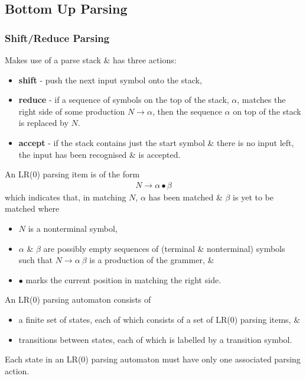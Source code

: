 \subsection{Bottom Up Parsing}

\subsubsection{Shift/Reduce Parsing}
Makes use of a parse stack \& has three actions:
\begin{itemize}
    \item \textbf{shift} - push the next input symbol onto the stack,
    \item \textbf{reduce} - if a sequence of symbols on the top of the stack, $\alpha$, 
    matches the right side of some production $N \rightarrow \alpha$, then the sequence 
    $\alpha$ on top of the stack is replaced by $N$.
    \item \textbf{accept} - if the stack contains just the start symbol \& there is no
    input left, the input has been recognised \& is accepted.
\end{itemize}

An LR(0) parsing item is of the form
\begin{align*}
    N \rightarrow \alpha \bullet \beta
\end{align*}
which indicates that, in matching $N$, $\alpha$ has been matched \& $\beta$ is yet to 
be matched where
\begin{itemize}
    \item $N$ is a nonterminal symbol,
    \item $\alpha$ \& $\beta$ are possibly empty sequences of (terminal \& nonterminal) 
    symbols such that $N \rightarrow \alpha\ \beta$ is a production of the grammer, \&
    \item $\bullet$ marks the current position in matching the right side.
\end{itemize}

An LR(0) parsing automaton consists of
\begin{itemize}
    \item a finite set of states, each of which consists of a set of LR(0) parsing items, \&
    \item transitions between states, each of which is labelled by a transition symbol.
\end{itemize}
Each state in an LR(0) parsing automaton must have only one associated parsing action.

